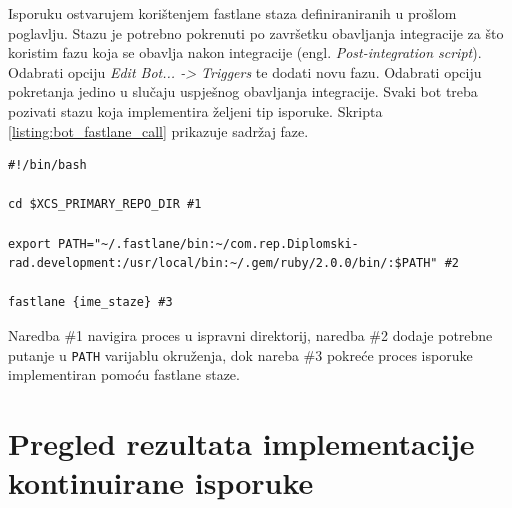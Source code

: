 \documentclass[times, utf8, diplomski, numeric]{fer}
\newcommand{\eng}[1]{(engl. \textit{#1})}
\begin{document}
Isporuku ostvarujem korištenjem fastlane staza definiraniranih u prošlom poglavlju. Stazu je potrebno pokrenuti po završetku obavljanja integracije za što koristim fazu koja se obavlja nakon integracije \eng{Post-integration script}. Odabrati opciju \textit{Edit Bot... -> Triggers} te dodati novu fazu. Odabrati opciju pokretanja jedino u slučaju uspješnog obavljanja integracije. Svaki bot treba pozivati stazu koja implementira željeni tip isporuke. Skripta \ref{listing:bot_fastlane_call} prikazuje sadržaj faze.

\begin{lstlisting}[caption=Sadržaj faze nakon obavljanja isporuke, label=listing:bot_fastlane_call]
#!/bin/bash

cd $XCS_PRIMARY_REPO_DIR #1

export PATH="~/.fastlane/bin:~/com.rep.Diplomski-rad.development:/usr/local/bin:~/.gem/ruby/2.0.0/bin/:$PATH" #2

fastlane {ime_staze} #3
\end{lstlisting}

Naredba \#1 navigira proces u ispravni direktorij, naredba \#2 dodaje potrebne putanje u \verb|PATH| varijablu okruženja, dok nareba \#3 pokreće proces isporuke implementiran pomoću fastlane staze.

\section{Pregled rezultata implementacije kontinuirane isporuke}
\end{document}
